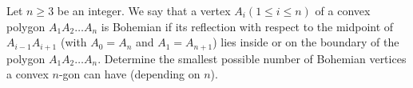 Let $n\geq 3$ be an integer. We say that a vertex $A_i (1\leq i\leq n)$ of a convex polygon $A_1A_2 \dots A_n$ is Bohemian if its reflection with respect to the midpoint of $A_{i-1}A_{i+1}$ (with $A_0=A_n$ and $A_1=A_{n+1}$) lies inside or on the boundary of the polygon $A_1A_2\dots A_n$. Determine the smallest possible number of Bohemian  vertices a convex $n$-gon can have (depending on $n$).